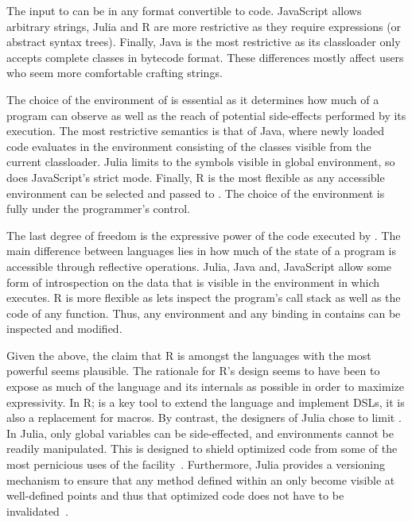 \documentclass[acmsmall, screen]{acmart}
\begin{document}
The input to \eval can be in any format convertible to code. JavaScript allows
arbitrary strings, Julia and R are more restrictive as they require expressions
(or abstract syntax trees). Finally, Java is the most restrictive as its
classloader only accepts complete classes in bytecode format. These differences
mostly affect users who seem more comfortable crafting strings.

The choice of the environment of \eval is essential as it determines how much of
a program \eval can observe as well as the reach of potential side-effects
performed by its execution. The most restrictive semantics is that of Java,
where newly loaded code evaluates in the environment consisting of the classes
visible from the current classloader. Julia limits \eval to the symbols visible
in global environment, so does JavaScript's strict mode. Finally, R is the most
flexible as any accessible environment can be selected and passed to \eval. The
choice of the environment is fully under the programmer's control.

The last degree of freedom is the expressive power of the code executed by
\eval. The main difference between languages lies in how much of the state of a
program is accessible through reflective operations. Julia, Java and, JavaScript
allow some form of introspection on the data that is visible in the environment
in which \eval executes. R is more flexible as lets \eval inspect the program's
call stack as well as the code of any function. Thus, any environment and any
binding in contains can be inspected and modified.

Given the above, the claim that R is amongst the languages with the most
powerful \eval seems plausible. The rationale for R's design seems to have been
to expose as much of the language and its internals as possible in order to
maximize expressivity. In R; \eval is a key tool to extend the language and
implement DSLs, it is also a replacement for macros. By contrast, the designers
of Julia chose to limit \eval. In Julia, only global variables can be
side-effected, and environments cannot be readily manipulated. This is designed
to shield optimized code from some of the most pernicious uses of the
facility~\cite{oopsla18a}. Furthermore, Julia provides a versioning mechanism to
ensure that any method defined within an \eval only become visible at
well-defined points and thus that optimized code does not have to be
invalidated~\cite{oopsla20a}.
\end{document}
